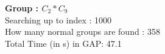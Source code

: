 \textbf{Group : $C_2*C_9$}\\
Searching up to index : 1000\\
How many normal groups are found : 358\\
Total Time (in s) in GAP: 47.1\\
